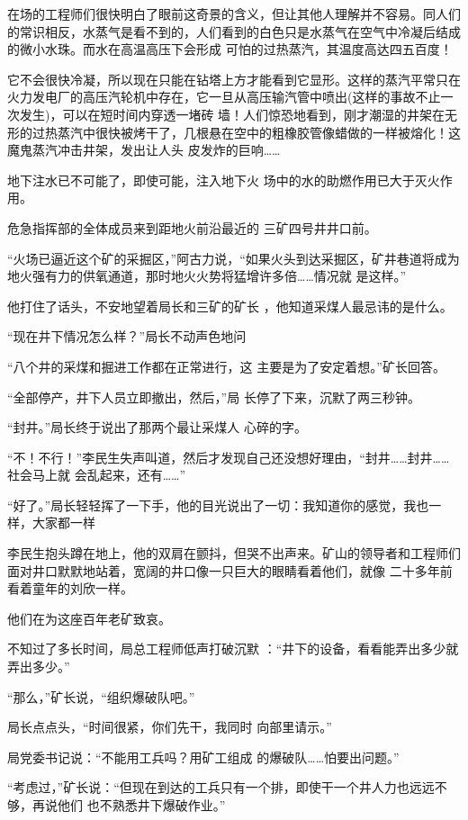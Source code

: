 \documentclass{article}
\begin{document}
在场的工程师们很快明白了眼前这奇景的含义，但让其他人理解并不容易。同人们的常识相反，水蒸气是看不到的，人们看到的白色只是水蒸气在空气中冷凝后结成的微小水珠。而水在高温高压下会形成
可怕的过热蒸汽，其温度高达四五百度！ 

它不会很快冷凝，所以现在只能在钻塔上方才能看到它显形。这样的蒸汽平常只在火力发电厂的高压汽轮机中存在，它一旦从高压输汽管中喷出(这样的事故不止一次发生)，可以在短时间内穿透一堵砖
\newpage
墙！人们惊恐地看到，刚才潮湿的井架在无形的过热蒸汽中很快被烤干了，几根悬在空中的粗橡胶管像蜡做的一样被熔化！这魔鬼蒸汽冲击井架，发出让人头
皮发炸的巨响…… 

地下注水已不可能了，即使可能，注入地下火
场中的水的助燃作用已大于灭火作用。 

危急指挥部的全体成员来到距地火前沿最近的
三矿四号井井口前。 

“火场已逼近这个矿的采掘区，”阿古力说，“如果火头到达采掘区，矿井巷道将成为地火强有力的供氧通道，那时地火火势将猛增许多倍……情况就
是这样。” 

他打住了话头，不安地望着局长和三矿的矿长
，他知道采煤人最忌讳的是什么。 

“现在井下情况怎么样？”局长不动声色地问

\newpage

“八个井的采煤和掘进工作都在正常进行，这
主要是为了安定着想。”矿长回答。 

“全部停产，井下人员立即撤出，然后，”局
长停了下来，沉默了两三秒钟。 

“封井。”局长终于说出了那两个最让采煤人
心碎的字。 

“不！不行！”李民生失声叫道，然后才发现自己还没想好理由，“封井……封井……社会马上就
会乱起来，还有……” 

“好了。”局长轻轻挥了一下手，他的目光说出了一切：我知道你的感觉，我也一样，大家都一样

李民生抱头蹲在地上，他的双肩在颤抖，但哭不出声来。矿山的领导者和工程师们面对井口默默地站着，宽阔的井口像一只巨大的眼睛看着他们，就像
二十多年前看着童年的刘欣一样。 

\newpage


他们在为这座百年老矿致哀。 

不知过了多长时间，局总工程师低声打破沉默
：“井下的设备，看看能弄出多少就弄出多少。” 


“那么，”矿长说，“组织爆破队吧。” 

局长点点头，“时间很紧，你们先干，我同时
向部里请示。” 

局党委书记说：“不能用工兵吗？用矿工组成
的爆破队……怕要出问题。” 

“考虑过，”矿长说：“但现在到达的工兵只有一个排，即使干一个井人力也远远不够，再说他们
也不熟悉井下爆破作业。” 
\end{document}
